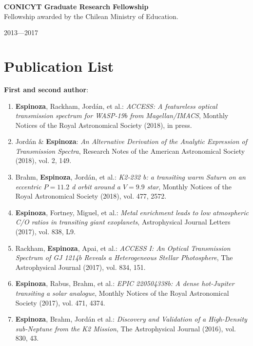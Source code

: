 \documentclass[11pt, a4paper]{article} %
\begin{document}
\begin{minipage}[t]{0.7\textwidth}
\begin{flushleft}%
  \setlength{\leftskip}{0.2cm}%
\textbf{CONICYT Graduate Research Fellowship}\\
Fellowship awarded by the Chilean Ministry of Education.
\end{flushleft}
\end{minipage}
\begin{minipage}[t]{0.3\textwidth}
\hfill 2013---2017
\end{minipage}

\section*{Publication List}
\begin{flushleft}%
  \setlength{\leftskip}{0.2cm}%
\textbf{First and second author}:
\begin{enumerate}
\setlength\itemsep{0.05cm}
\item \textbf{Espinoza}, Rackham, Jord\'an, et al.: \textit{ACCESS: A featureless optical transmission spectrum for WASP-19b from Magellan/IMACS}, Monthly Notices of the Royal Astronomical Society (2018), in press.
\item Jord\'an \& \textbf{Espinoza}: \textit{An Alternative Derivation of the Analytic Expression of Transmission Spectra}, Research Notes of the American Astronomical Society (2018), vol. 2, 149.
\item Brahm, \textbf{Espinoza}, Jord\'an, et al.: \textit{K2-232 b: a transiting warm Saturn on an eccentric $P = 11.2$ d orbit around a $V = 9.9$ star}, Monthly Notices of the Royal Astronomical Society (2018), vol. 477, 2572.
\item \textbf{Espinoza}, Fortney, Miguel, et al.: \textit{Metal enrichment leads to low atmospheric C/O ratios in transiting giant exoplanets}, Astrophysical Journal Letters (2017), vol. 838, L9.
\item Rackham, \textbf{Espinoza}, Apai, et al.: \textit{ACCESS I: An Optical Transmission Spectrum of GJ 1214b Reveals a Heterogeneous Stellar Photosphere}, The Astrophysical Journal (2017), vol. 834, 151.
\item \textbf{Espinoza}, Rabus, Brahm, et al.: \textit{EPIC 220504338b: A dense hot-Jupiter transiting a solar analogue}, Monthly Notices of the Royal Astronomical Society (2017), vol. 471, 4374.
\item \textbf{Espinoza}, Brahm, Jord\'an et al.: \textit{Discovery and Validation of a High-Density sub-Neptune from the K2 Mission}, The Astrophysical Journal (2016), vol. 830, 43.

\end{enumerate}
\end{flushleft}
\end{document}
